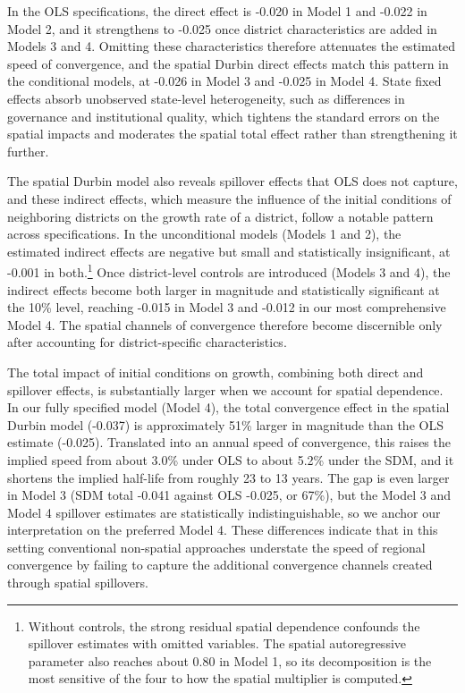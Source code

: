 \documentclass[
  letterpaper,
  DIV=11,
  numbers=noendperiod]{scrartcl}
\begin{document}
\endgroup

In the OLS specifications, the direct effect is -0.020 in Model 1 and
-0.022 in Model 2, and it strengthens to -0.025 once district
characteristics are added in Models 3 and 4. Omitting these
characteristics therefore attenuates the estimated speed of convergence,
and the spatial Durbin direct effects match this pattern in the
conditional models, at -0.026 in Model 3 and -0.025 in Model 4. State
fixed effects absorb unobserved state-level heterogeneity, such as
differences in governance and institutional quality, which tightens the
standard errors on the spatial impacts and moderates the spatial total
effect rather than strengthening it further.

The spatial Durbin model also reveals spillover effects that OLS does
not capture, and these indirect effects, which measure the influence of
the initial conditions of neighboring districts on the growth rate of a
district, follow a notable pattern across specifications. In the
unconditional models (Models 1 and 2), the estimated indirect effects
are negative but small and statistically insignificant, at -0.001 in
both.\footnote{Without controls, the strong residual spatial dependence
  confounds the spillover estimates with omitted variables. The spatial
  autoregressive parameter also reaches about 0.80 in Model 1, so its
  decomposition is the most sensitive of the four to how the spatial
  multiplier is computed.} Once district-level controls are introduced
(Models 3 and 4), the indirect effects become both larger in magnitude
and statistically significant at the 10\% level, reaching -0.015 in
Model 3 and -0.012 in our most comprehensive Model 4. The spatial
channels of convergence therefore become discernible only after
accounting for district-specific characteristics.

The total impact of initial conditions on growth, combining both direct
and spillover effects, is substantially larger when we account for
spatial dependence. In our fully specified model (Model 4), the total
convergence effect in the spatial Durbin model (-0.037) is approximately
51\% larger in magnitude than the OLS estimate (-0.025). Translated into
an annual speed of convergence, this raises the implied speed from about
3.0\% under OLS to about 5.2\% under the SDM, and it shortens the
implied half-life from roughly 23 to 13 years. The gap is even larger in
Model 3 (SDM total -0.041 against OLS -0.025, or 67\%), but the Model 3
and Model 4 spillover estimates are statistically indistinguishable, so
we anchor our interpretation on the preferred Model 4. These differences
indicate that in this setting conventional non-spatial approaches
understate the speed of regional convergence by failing to capture the
additional convergence channels created through spatial spillovers.
\end{document}
